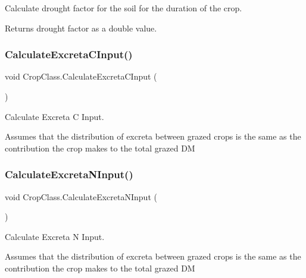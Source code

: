 Calculate drought factor for the soil for the duration of the crop. 

\begin{DoxyReturn}{Returns}
drought factor as a double value. 
\end{DoxyReturn}
\mbox{\label{class_crop_class_aa846428c46858858c7eda67db3cbbb0b}} 
\subsubsection{\texorpdfstring{CalculateExcretaCInput()}{CalculateExcretaCInput()}}
{\footnotesize\ttfamily void Crop\+Class.\+Calculate\+Excreta\+C\+Input (\begin{DoxyParamCaption}{ }\end{DoxyParamCaption})\hspace{0.3cm}{\ttfamily [inline]}}



Calculate Excreta C Input. 

Assumes that the distribution of excreta between grazed crops is the same as the contribution the crop makes to the total grazed DM \mbox{\label{class_crop_class_acd893cea7f299839620d4e0556b36cc8}} 
\subsubsection{\texorpdfstring{CalculateExcretaNInput()}{CalculateExcretaNInput()}}
{\footnotesize\ttfamily void Crop\+Class.\+Calculate\+Excreta\+N\+Input (\begin{DoxyParamCaption}{ }\end{DoxyParamCaption})\hspace{0.3cm}{\ttfamily [inline]}}



Calculate Excreta N Input. 

Assumes that the distribution of excreta between grazed crops is the same as the contribution the crop makes to the total grazed DM \mbox{\label{class_crop_class_a8266c04c74b6f19d1f58073acc18b3a5}} 
